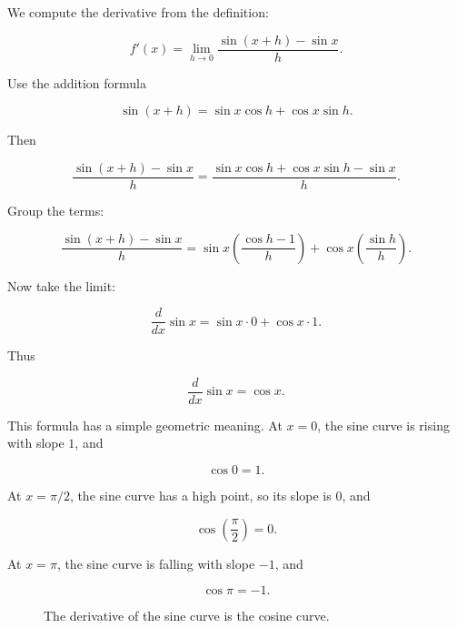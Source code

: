 We compute the derivative from the definition:

\[
f'(x)
=
\lim_{h\to0}\frac{\sin(x+h)-\sin x}{h}.
\]

Use the addition formula

\[
\sin(x+h)=\sin x\cos h+\cos x\sin h.
\]

Then

\[
\frac{\sin(x+h)-\sin x}{h}
=
\frac{\sin x\cos h+\cos x\sin h-\sin x}{h}.
\]

Group the terms:

\[
\frac{\sin(x+h)-\sin x}{h}
=
\sin x\left(\frac{\cos h-1}{h}\right)
+
\cos x\left(\frac{\sin h}{h}\right).
\]

Now take the limit:

\[
\frac{d}{dx}\sin x
=
\sin x\cdot0+\cos x\cdot1.
\]

Thus

\[
\boxed{
\frac{d}{dx}\sin x=\cos x.
}
\]

This formula has a simple geometric meaning.  At \(x=0\), the sine curve is rising with slope \(1\), and

\[
\cos0=1.
\]

At \(x=\pi/2\), the sine curve has a high point, so its slope is \(0\), and

\[
\cos\left(\frac{\pi}{2}\right)=0.
\]

At \(x=\pi\), the sine curve is falling with slope \(-1\), and

\[
\cos\pi=-1.
\]

\begin{figure}[h]
\centering
{}
\caption{The derivative of the sine curve is the cosine curve.}
\label{fig:sine-derivative-cosine}
\end{figure}

